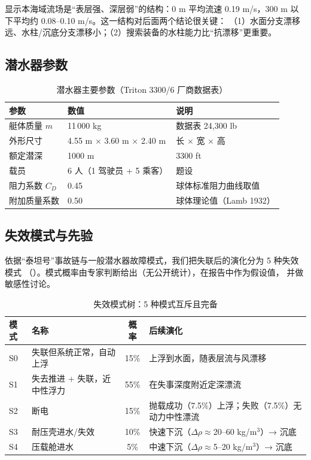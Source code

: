  显示本海域流场是“表层强、深层弱”的结构：0 m 平均流速
0.19 m/s，300 m 以下平均约 0.08--0.10 m/s。这一结构对后面两个结论很关键：
（1）水面分支漂移远、水柱/沉底分支漂移小；（2）搜索装备的水柱能力比“抗漂移”更重要。

\subsection{潜水器参数}

\begin{table}[H]
\centering\small
\caption{潜水器主要参数（Triton 3300/6 厂商数据表）}
\label{tab:vehicle}
\begin{tabular}{@{}ll|l@{}}
\toprule
参数 & 数值 & 说明\\
\midrule
艇体质量 $m$ & 11\,000 kg & 数据表 24,300 lb\\
外形尺寸 & 4.55 m $\times$ 3.60 m $\times$ 2.40 m & 长 $\times$ 宽 $\times$ 高\\
额定潜深 & 1000 m & 3300 ft\\
载员 & 6 人（1 驾驶员 + 5 乘客） & 题设\\
阻力系数 $C_D$ & 0.45 & 球体标准阻力曲线取值\\
附加质量系数 & 0.50 & 球体理论值（Lamb 1932）\\
\bottomrule
\end{tabular}
\end{table}

\subsection{失效模式与先验}

依据“泰坦号”事故链与一般潜水器故障模式，我们把失联后的演化分为 5 种失效模式
（）。模式概率由专家判断给出（无公开统计），在报告中作为假设值，
并做敏感性讨论。

\begin{table}[H]
\centering\small
\caption{失效模式树：5 种模式互斥且完备}
\label{tab:failure}
\begin{tabular}{@{}llcl@{}}
\toprule
模式 & 名称 & 概率 & 后续演化\\
\midrule
S0 & 失联但系统正常，自动上浮 & 15\% & 上浮到水面，随表层流与风漂移\\
S1 & 失去推进 + 失联，近中性浮力 & 55\% & 在失事深度附近定深漂流\\
S2 & 断电 & 15\% & 抛载成功（7.5\%）上浮；失败（7.5\%）无动力中性漂流\\
S3 & 耐压壳进水/失效 & 10\% & 快速下沉（$\Delta\rho\approx$20--60 kg/m$^3$）→ 沉底\\
S4 & 压载舱进水 & 5\% & 中速下沉（$\Delta\rho\approx$5--20 kg/m$^3$）→ 沉底\\
\bottomrule
\end{tabular}
\end{table}


